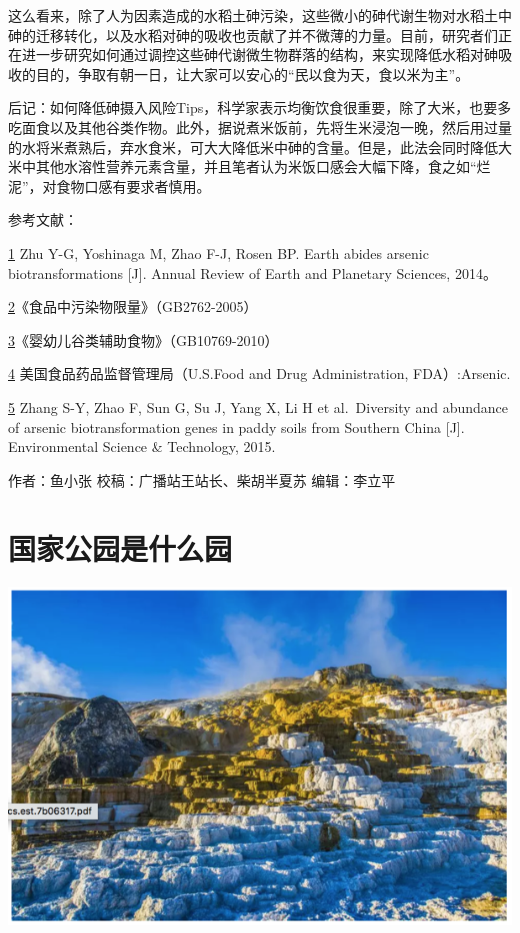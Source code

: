 \documentclass[]{book}
\begin{document}
这么看来，除了人为因素造成的水稻土砷污染，这些微小的砷代谢生物对水稻土中砷的迁移转化，以及水稻对砷的吸收也贡献了并不微薄的力量。目前，研究者们正在进一步研究如何通过调控这些砷代谢微生物群落的结构，来实现降低水稻对砷吸收的目的，争取有朝一日，让大家可以安心的``民以食为天，食以米为主''。

后记：如何降低砷摄入风险Tips，科学家表示均衡饮食很重要，除了大米，也要多吃面食以及其他谷类作物。此外，据说煮米饭前，先将生米浸泡一晚，然后用过量的水将米煮熟后，弃水食米，可大大降低米中砷的含量。但是，此法会同时降低大米中其他水溶性营养元素含量，并且笔者认为米饭口感会大幅下降，食之如``烂泥''，对食物口感有要求者慎用。

参考文献：

\href{陈心想，耿增超。西北农林科技大学学报（自然科学版），2013，41:\%20167-174．}{1} Zhu Y-G, Yoshinaga M, Zhao F-J, Rosen BP. Earth abides arsenic biotransformations {[}J{]}. Annual Review of Earth and Planetary Sciences, 2014。

\href{Kezhen\%20Qian,\%20Ajay\%20Kumar,\%20et.al.\%20Renew.\%20and\%20Sustain.\%20Energy\%20Reviews,\%202015,\%2042:\%201055-1064.}{2}《食品中污染物限量》（GB2762-2005）

\href{Puga\%20A\%20P,\%20Abreu\%20C\%20A,\%20et\%20al.\%20J.\%20of\%20Environ.\%20Manage.,\%202015,\%20159:\%2086–93.}{3}《婴幼儿谷类辅助食物》（GB10769-2010）

\href{Khan\%20S,\%20Cai\%20Chao,\%20et\%20al．\%20Environ.\%20Sci.\%20\&\%20Technol.,\%202013,\%2047\%20:\%208624-8632．}{4} 美国食品药品监督管理局（U.S.Food and Drug Administration, FDA）:Arsenic.

\href{Bi\%20H,\%20Huang\%20X,\%20et\%20al.\%20Small\%202014,\%2010,\%203544.}{5} Zhang S-Y, Zhao F, Sun G, Su J, Yang X, Li H et al.~Diversity and abundance of arsenic biotransformation genes in paddy soils from Southern China {[}J{]}. Environmental Science \& Technology, 2015.

作者：鱼小张
校稿：广播站王站长、柴胡半夏苏
编辑：李立平

\hypertarget{ux56fdux5bb6ux516cux56edux662fux4ec0ux4e48ux56ed}{%
\section{国家公园是什么园}\label{ux56fdux5bb6ux516cux56edux662fux4ec0ux4e48ux56ed}}

\includegraphics[width=8.33in]{images/park1}
\end{document}
